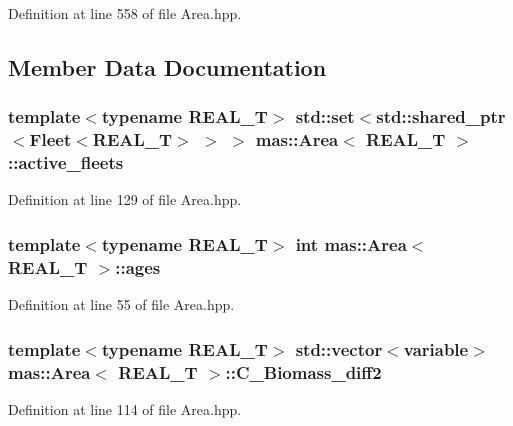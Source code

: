 Definition at line 558 of file Area.\-hpp.



\subsection{Member Data Documentation}
\hypertarget{structmas_1_1_area_a94bbe58cca17c234df40191bebfef069}{
\subsubsection[{active\-\_\-fleets}]{\setlength{\rightskip}{0pt plus 5cm}template$<$typename R\-E\-A\-L\-\_\-\-T$>$ std\-::set$<$std\-::shared\-\_\-ptr$<${\bf Fleet}$<$R\-E\-A\-L\-\_\-\-T$>$ $>$ $>$ {\bf mas\-::\-Area}$<$ R\-E\-A\-L\-\_\-\-T $>$\-::active\-\_\-fleets}}\label{structmas_1_1_area_a94bbe58cca17c234df40191bebfef069}


Definition at line 129 of file Area.\-hpp.

\hypertarget{structmas_1_1_area_a9eec0d816a288d4c8afeb0e2dffa12df}{
\subsubsection[{ages}]{\setlength{\rightskip}{0pt plus 5cm}template$<$typename R\-E\-A\-L\-\_\-\-T$>$ int {\bf mas\-::\-Area}$<$ R\-E\-A\-L\-\_\-\-T $>$\-::ages}}\label{structmas_1_1_area_a9eec0d816a288d4c8afeb0e2dffa12df}


Definition at line 55 of file Area.\-hpp.

\hypertarget{structmas_1_1_area_a48db0d88a1d19d6e6a43fef8c9a2ab0a}{
\subsubsection[{C\-\_\-\-Biomass\-\_\-diff2}]{\setlength{\rightskip}{0pt plus 5cm}template$<$typename R\-E\-A\-L\-\_\-\-T$>$ std\-::vector$<${\bf variable}$>$ {\bf mas\-::\-Area}$<$ R\-E\-A\-L\-\_\-\-T $>$\-::C\-\_\-\-Biomass\-\_\-diff2}}\label{structmas_1_1_area_a48db0d88a1d19d6e6a43fef8c9a2ab0a}


Definition at line 114 of file Area.\-hpp.

